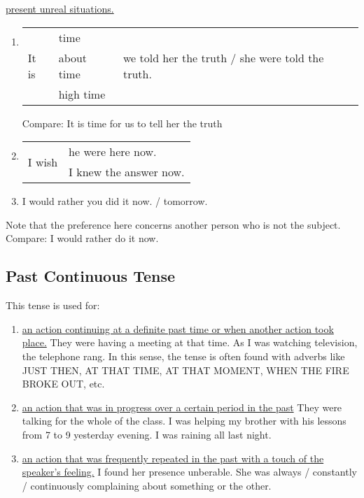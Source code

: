 \begin{enumerate}
        \newline
        \underline{present unreal situations.}
        \begin{enumerate}
            \item
                \begin{tabular}{lll}
                    \multirow{3}{*}{It is} & time       & \multirow{3}{*}{we
                    told her the truth / she were told the truth.} \\
                                           & about time & \\
                                           & high time  &
                \end{tabular}
                \newline
                Compare: It is time for us to tell her the truth
            \item
                \begin{tabular}{ll}
                    \multirow{2}{*}{I wish} & he were here now. \\
                    & I knew the answer now.
                \end{tabular}
            \item I would rather you did it now. / tomorrow.
        \end{enumerate}
        Note that the preference here concerns another person who is not the
        subject.
        \newline
        Compare: I would rather do it now.
\end{enumerate}

\subsection{Past Continuous Tense}
This tense is used for:
\begin{enumerate}
    \item \underline{an action continuing at a definite past time or when
        another action took place.}
        \newline
        They were having a meeting at that time.
        As I was watching television, the telephone rang.
        \newline
        In this sense, the tense is often found with adverbs like JUST THEN, AT
        THAT TIME, AT THAT MOMENT, WHEN THE FIRE BROKE OUT, etc.
    \item \underline{an action that was in progress over a certain period in the
        past}
        \newline
        They were talking for the whole of the class.
        \newline
        I was helping my brother with his lessons from 7 to 9 yesterday evening.
        \newline
        I was raining all last night.
    \item \underline{an action that was frequently repeated in the past with a
        touch of the speaker's feeling.}
        \newline
        I found her presence unberable. She was always / constantly /
        continuously complaining about something or the other.
\end{enumerate}

